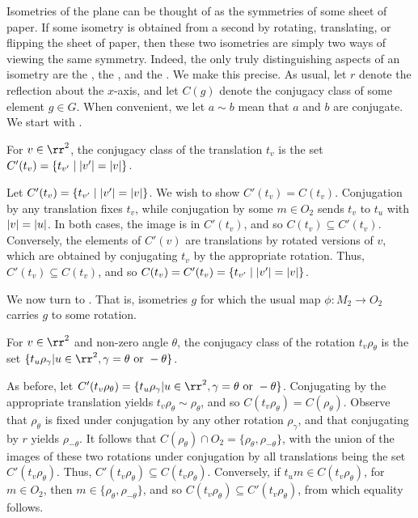 \documentclass{scrartcl}
\begin{document}


\begin{solution}
        Isometries of the plane can be thought of as the symmetries of some sheet of paper. If some isometry is obtained from a second by rotating, translating, or flipping the sheet of paper, then these two isometries are simply two ways of viewing the same symmetry. Indeed, the only truly distinguishing aspects of an isometry are the , the , and the . We make this precise. As usual, let $r$ denote the reflection about the $x$-axis, and let $C(g)$ denote the conjugacy class of some element $g\in G$. When convenient, we let $a\sim b$ mean that $a$ and $b$ are conjugate. We start with .
        \begin{lemma}
        For $v\in \rr^2$, the conjugacy class of the translation $t_v$ is the set $C'(t_v)=\{t_{v'}\mid \lvert v'\rvert=\lvert v\rvert\}$.
        \end{lemma}
        \begin{subproof}
        Let $C'(t_v)=\{t_{v'}\mid \lvert v'\rvert=\lvert v\rvert\}$. We wish to show $C'(t_v)=C(t_v)$. Conjugation by any translation fixes $t_v$, while conjugation by some $m\in O_2$ sends $t_v$ to $t_u$ with $\lvert v\rvert=\lvert u\rvert$. In both cases, the image is in $C'(t_v)$, and so $C(t_v)\subseteq C'(t_v)$. Conversely, the elements of $C'(v)$ are translations by rotated versions of $v$, which are obtained by conjugating $t_v$ by the appropriate rotation. Thus, $C'(t_v)\subseteq C(t_v)$, and so $C(t_v)=C'(t_v)=\{t_{v'}\mid \lvert v'\rvert=\lvert v\rvert\}$.
        \end{subproof}
    
        We now turn to . That is, isometries $g$ for which the usual map $\phi: M_2 \to O_2$ carries $g$ to some rotation.
        \begin{lemma}
        For $v\in \rr^2$ and non-zero angle $\theta$, the conjugacy class of the rotation $t_v\rho_\theta$ is the set $\{t_u\rho_\gamma| u\in \rr^2, \gamma=\theta \text{ or } -\theta\}$.
        \end{lemma}
        \begin{subproof} As before, let $C'(t_v\rho_\theta)=\{t_u\rho_\gamma| u\in \rr^2, \gamma=\theta \text{ or } -\theta\}$. Conjugating by the appropriate translation yields $t_v\rho_\theta\sim \rho_\theta$, and so $C(t_v\rho_\theta)=C(\rho_\theta)$. Observe that $\rho_\theta$ is fixed under conjugation by any other rotation $\rho_\gamma$, and that conjugating by $r$ yields $\rho_{-\theta}$. It follows that $C(\rho_\theta)\cap O_2=\{\rho_{\theta},\rho_{-\theta}\}$, with the union of the images of these two rotations under conjugation by all translations being the set $C'(t_v\rho_\theta)$. Thus, $C'(t_v\rho_\theta)\subseteq C(t_v\rho_\theta)$. Conversely, if $t_um\in C(t_v\rho_\theta)$, for $m\in O_2$, then $m\in \{\rho_{\theta},\rho_{-\theta}\}$, and so $C(t_v\rho_\theta)\subseteq C'(t_v\rho_\theta)$, from which equality follows.
        \end{subproof}
    

\end{solution}
\end{document}
